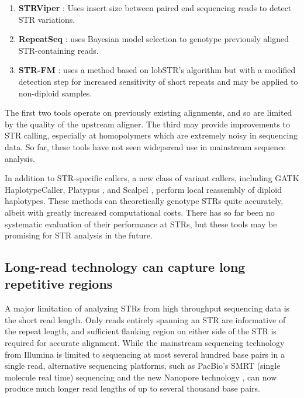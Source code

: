 \begin{enumerate}
\item \textbf{STRViper} \cite{CaoTaskerWilladsenEtAl2014}: Uses insert size between paired end sequencing reads to detect STR variations.
\item \textbf{RepeatSeq} \cite{HighnamFranckMartinEtAl2013}: uses Bayesian model selection to genotype previously aligned STR-containing reads.
\item \textbf{STR-FM} \cite{FungtammasanAnandaHileEtAl2015}: uses a method based on lobSTR's algorithm but with a modified detection step for increased sensitivity of short repeats and may be applied to non-diploid samples.
\end{enumerate}

The first two tools operate on previously existing alignments, and so are limited by the quality of the upstream aligner. The third may provide improvements to STR calling, especially at homopolymers which are extremely noisy in sequencing data. So far, these tools have not seen widepsread use in mainstream sequence analysis.

In addition to STR-specific callers, a new class of variant callers, including GATK \cite{McKennaHannaBanksEtAl2010} HaplotypeCaller, Platypus \cite{RimmerPhanMathiesonEtAl2014}, and Scalpel \cite{NarzisiOextquotesingleRaweIossifovEtAl2014}, perform local reassembly of diploid haplotypes. These methods can theoretically genotype STRs quite accurately, albeit with greatly increased computational costs. There has so far been no systematic evaluation of their performance at STRs, but these tools may be promising for STR analysis in the future.

\subsection{Long-read technology can capture long repetitive regions}
A major limitation of analyzing STRs from high throughput sequencing data is the short read length. Only reads entirely spanning an STR are informative of the repeat length, and sufficient flanking region on either side of the STR is required for accurate alignment. While the mainstream sequencing technology from Illumina is limited to sequencing at most several hundred base pairs in a single read, alternative sequencing platforms, such as PacBio's SMRT (single molecule real time) sequencing \cite{EidFehrGrayEtAl2009} and the new Nanopore technology \cite{ClarkeWuJayasingheEtAl2009}, can now produce much longer read lengths of up to several thousand base pairs.

